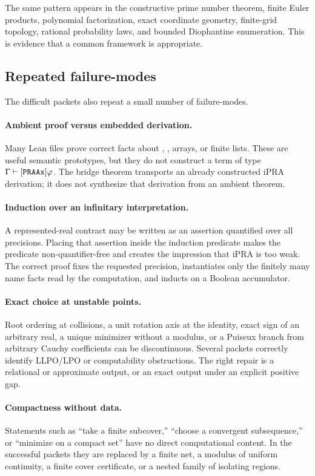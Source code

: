 The same pattern appears in the constructive prime number theorem, finite
Euler products, polynomial factorization, exact coordinate geometry,
finite-grid topology, rational probability laws, and bounded Diophantine
enumeration.  This is evidence that a common framework is appropriate.

\subsection{Repeated failure-modes}

The difficult packets also repeat a small number of failure-modes.

\paragraph{Ambient proof versus embedded derivation.}
Many Lean files prove correct facts about , , arrays, or
finite lists.  These are useful semantic prototypes, but they do not
construct a term of type \(\Gamma\vdash[\texttt{PRAAx}]\varphi\).  The bridge theorem
 transports an already constructed iPRA derivation; it
does not synthesize that derivation from an ambient theorem.

\paragraph{Induction over an infinitary interpretation.}
A represented-real contract may be written as an assertion quantified over
all precisions.  Placing that assertion inside the induction predicate makes
the predicate non-quantifier-free and creates the impression that iPRA is too
weak.  The correct proof fixes the requested precision, instantiates only the
finitely many name facts read by the computation, and inducts on a Boolean
accumulator.

\paragraph{Exact choice at unstable points.}
Root ordering at collisions, a unit rotation axis at the identity, exact sign
of an arbitrary real, a unique minimizer without a modulus, or a Puiseux
branch from arbitrary Cauchy coefficients can be discontinuous.  Several
packets correctly identify LLPO/LPO or computability obstructions.  The right
repair is a relational or approximate output, or an exact output under an
explicit positive gap.

\paragraph{Compactness without data.}
Statements such as ``take a finite subcover,'' ``choose a convergent
subsequence,'' or ``minimize on a compact set'' have no direct computational
content.  In the successful packets they are replaced by a finite net, a
modulus of uniform continuity, a finite cover certificate, or a nested family
of isolating regions.

